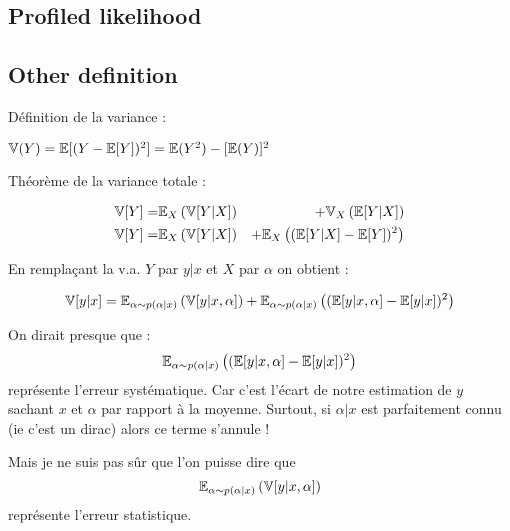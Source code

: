 

\subsection{Profiled likelihood} %
\label{sub:profiled_likelihood}



\subsection{Other definition} %
\label{sub:other_definition}

Définition de la variance :

$\mathbb{V}(Y) = \mathbb{E}[(Y - \mathbb{E}[Y])^2] = \mathbb{E}(Y^2) - [\mathbb{E}(Y)]^2$

Théorème de la variance totale \needcite :

\begin{eqnarray}
    \mathbb{V}[Y] =& \mathbb{E}_X \left (\mathbb{V}[Y|X] \right ) &+ \mathbb{V}_X \left (\mathbb{E}[Y|X]\right ) \\
    \mathbb{V}[Y] =& \mathbb{E}_X \left (\mathbb{V}[Y|X] \right ) &+ \mathbb{E}_X \left ( (\mathbb{E} [Y|X]  - \mathbb{E}[Y])^2\right )
\end{eqnarray}


En remplaçant la v.a. $Y$ par $y|x$ et $X$ par $\alpha$ on obtient :

$$
\mathbb{V}[y|x] = \mathbb{E}_{\alpha \sim p(\alpha|x)} \left (\mathbb{V}[y|x, \alpha] \right ) + \mathbb{E}_{\alpha \sim p(\alpha|x)} \left ( (\mathbb{E} [y|x, \alpha]  - \mathbb{E}[y|x])^2\right )
$$


On dirait presque que : 
$$\mathbb{E}_{\alpha \sim p(\alpha|x)} \left ((\mathbb{E} [y|x, \alpha]  - \mathbb{E}[y|x])^2\right )$$
représente l'erreur systématique. 
Car c'est l'écart de notre estimation de $y$ sachant $x$ et $\alpha$ par rapport à la moyenne.
Surtout, si $\alpha|x$ est parfaitement connu (ie c'est un dirac) alors ce terme s'annule !

Mais je ne suis pas sûr que l'on puisse dire que
$$\mathbb{E}_{\alpha \sim p(\alpha|x)} \left (\mathbb{V}[y|x, \alpha] \right )$$
représente l'erreur statistique.

